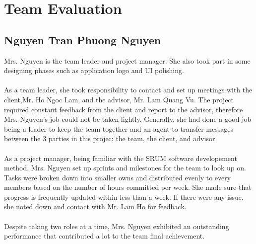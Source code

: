 \chapter{Team Evaluation}
\section{Nguyen Tran Phuong Nguyen}
Mrs. Nguyen is the team leader and project manager. She also took part in some designing phases such as application logo and UI polishing.
\\
\\
As a team leader, she took responsibility to contact and set up meetings with the client,Mr. Ho Ngoc Lam, and the advisor, Mr. Lam Quang Vu. The project required constant feedback from the client and report to the advisor, therefore Mrs. Nguyen's job could not be taken lightly. Generally, she had done a good job being a leader to keep the team together and an agent to transfer messages between the 3 parties in this projec: the team, the client, and advisor. 
\\
\\
As a project manager, being familiar with the SRUM software developement method, Mrs. Nguyen set up sprints and milestones for the team to look up on. Tasks were broken down into smaller owns and distributed evenly to every members based on the number of hours committed per week. She made sure that progress is frequently updated within less than a week. If there were any issue, she noted down and contact with Mr. Lam Ho for feedback.
\\
\\
Despite taking two roles at a time, Mrs. Nguyen exhibited an outstanding performance that contributed a lot to the team final achievement.
